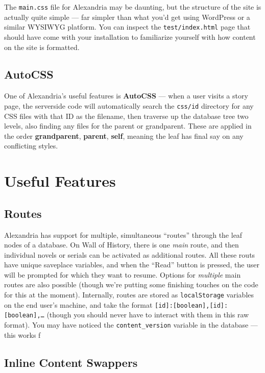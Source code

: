 \documentclass[11pt]{article} %
\begin{document}
The \texttt{main.css} file for Alexandria may be daunting, but the structure of the site is actually quite simple — far simpler than what you’d get using WordPress or a similar WYSIWYG platform. You can inspect the \texttt{test/index.html} page that should have come with your installation to familiarize yourself with how content on the site is formatted.

\subsection{AutoCSS}

One of Alexandria’s useful features is \textbf{AutoCSS} — when a user visits a story page, the serverside code will automatically search the \texttt{css/id} directory for any CSS files with that ID as the filename, then traverse up the database tree two levels, also finding any files for the parent or grandparent. These are applied in the order \textbf{grandparent}, \textbf{parent}, \textbf{self}, meaning the leaf has final say on any conflicting styles.

\section{Useful Features}

\subsection{Routes}

Alexandria has support for multiple, simultaneous “routes” through the leaf nodes of a database. On Wall of History, there is one \textit{main} route, and then individual novels or serials can be activated as additional routes. All these routs have unique saveplace variables, and when the “Read” button is pressed, the user will be prompted for which they want to resume. Options for \textit{multiple} main routes are also possible (though we’re putting some finishing touches on the code for this at the moment). Internally, routes are stored as \texttt{localStorage} variables on the end user’s machine, and take the format \texttt{[id]:[boolean],[id]:[boolean],…} (though you should never have to interact with them in this raw format).
You may have noticed the \texttt{content\_version} variable in the database — this works f

\subsection{Inline Content Swappers}
\end{document}
